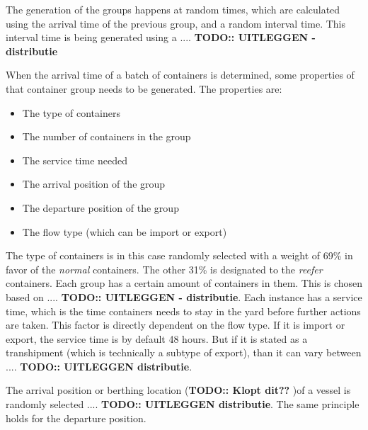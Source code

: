 \documentclass[]{article}
\begin{document}
The generation of the groups happens at random times, which are calculated
using the arrival time of the previous group, and a random interval time. This
interval time is being generated using a .... \textbf{TODO:: UITLEGGEN -
	distributie}

When the arrival time of a batch of containers is determined, some properties
of that container group needs to be generated. The properties are: 
\begin{itemize}
	\item The type of containers
	\item The number of containers in the group
	\item The service time needed
	\item The arrival position of the group
	\item The departure position of the group
	\item The flow type (which can be import or export)
\end{itemize}

The type of containers is in this case randomly selected with a weight of 69\%
in favor of the \textit{normal} containers. The other 31\% is designated to the
\textit{reefer} containers. Each group has a certain amount of containers in
them. This is chosen based on .... \textbf{TODO:: UITLEGGEN - distributie}.
Each instance has a service time, which is the time containers needs to stay in
the yard before further actions are taken. This factor is directly dependent on
the flow type. If it is import or export, the service time is by default 48
hours. But if it is stated as a transhipment (which is technically a subtype of
export), than it can vary between .... \textbf{TODO:: UITLEGGEN \-
	distributie}.

The arrival position or berthing location (\textbf{TODO:: Klopt dit??} )of a
vessel is randomly selected .... \textbf{TODO:: UITLEGGEN \- distributie}. The
same principle holds for the departure position.
\end{document}
